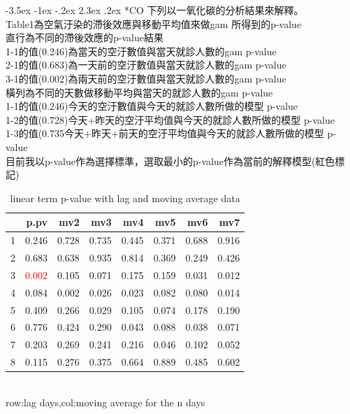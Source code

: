 \documentclass[a4paper, 12pt]{article}
\makeatletter
\def\large{\fontsize{14}{20}\selectfont}
\renewcommand\subsection{\@startsection {subsection}{1}{\z@}%
                                   {-3.5ex \@plus -1ex \@minus -.2ex}%
                                   {2.3ex \@plus.2ex}%
                                   {\centering\normalfont\large\bfseries}}
\makeatother
\begin{document}
\subsection*{CO}
下列以一氧化碳的分析結果來解釋。\\
Table1為空氣汙染的滯後效應與移動平均值來做gam 所得到的p-value\\
直行為不同的滯後效應的p-value結果\\
1-1的值(0.246)為當天的空汙數值與當天就診人數的gam p-value\\
2-1的值(0.683)為一天前的空汙數值與當天就診人數的gam p-value\\
3-1的值(0.002)為兩天前的空汙數值與當天就診人數的gam p-value\\
橫列為不同的天數做移動平均與當天的就診人數的gam p-value\\
1-1的值(0.246)今天的空汙數值與今天的就診人數所做的模型 p-value\\
1-2的值(0.728)今天+昨天的空汙平均值與今天的就診人數所做的模型 p-value\\
1-3的值(0.735今天+昨天+前天的空汙平均值與今天的就診人數所做的模型 p-value\\
目前我以p-value作為選擇標準，選取最小的p-value作為當前的解釋模型(紅色標記)
\begin{table}[h]
\centering
\caption{linear term p-value with lag and moving average data}
\begin{tabular}{rrrrrrrr}
  \hline
 & p.pv & mv2 & mv3 & mv4 & mv5 & mv6 & mv7 \\
  \hline
1 & 0.246 & 0.728 & 0.735 & 0.445 & 0.371 & 0.688 & 0.916 \\
  2 & 0.683 & 0.638 & 0.935 & 0.814 & 0.369 & 0.249 & 0.426 \\
  3 & \textcolor{red}{0.002} & 0.105 & 0.071 & 0.175 & 0.159 & 0.031 & 0.012 \\
  4 & 0.084 & 0.002 & 0.026 & 0.023 & 0.082 & 0.080 & 0.014 \\
  5 & 0.409 & 0.266 & 0.029 & 0.105 & 0.074 & 0.178 & 0.190 \\
  6 & 0.776 & 0.424 & 0.290 & 0.043 & 0.088 & 0.038 & 0.071 \\
  7 & 0.203 & 0.269 & 0.241 & 0.216 & 0.046 & 0.102 & 0.052 \\
  8 & 0.115 & 0.276 & 0.375 & 0.664 & 0.889 & 0.485 & 0.602 \\
   \hline
\end{tabular}
\\row:lag days,col:moving average for the n days
\end{table}
\end{document}
